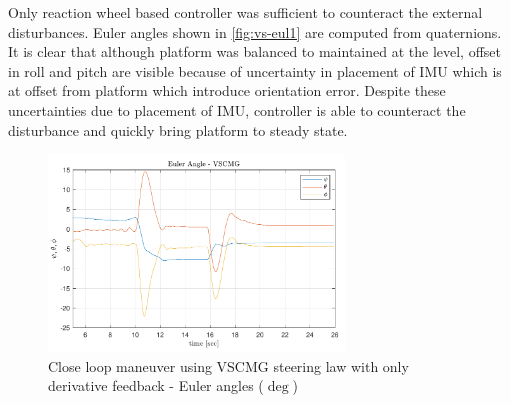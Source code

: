Only reaction wheel based controller was sufficient to counteract the external disturbances. Euler angles shown in \autoref{fig:vs-eul1} are computed from quaternions. It is clear that although platform was balanced to maintained at the level, offset in roll and pitch are visible because of uncertainty in placement of IMU which is at  offset from platform which introduce orientation error. Despite these uncertainties due to placement of IMU, controller is able to counteract the disturbance and quickly bring platform to steady state.
\begin{figure}[ht]
    \centering
    \includegraphics[width=0.7\textwidth]{figures/plots/exp/vs-eul1.pdf}
    \caption{Close loop maneuver using VSCMG steering law with only derivative feedback - Euler angles ($\deg$)}
    \label{fig:vs-eul1}
\end{figure}

